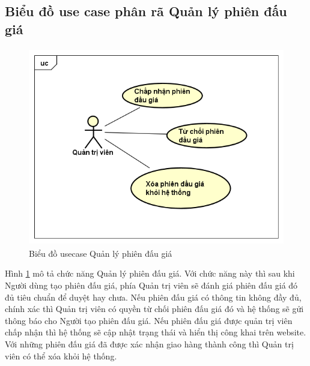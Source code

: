 \documentclass[../DoAn.tex]{subfiles}
\begin{document}
\subsection{Biểu đồ use case phân rã Quản lý phiên đấu giá}
\begin{figure}[H]
    \centering
    \includegraphics[width=0.75\linewidth,height=8.67cm]{Hinhve/uc quản lý phiên đấu giá.png}
    \caption{Biểu đồ usecase Quản lý phiên đấu giá}
    \label{fig:Fig23}
\end{figure}
Hình \ref{fig:Fig23} mô tả chức năng Quản lý phiên đấu giá. Với chức năng này thì sau khi Người dùng tạo phiên đấu giá, phía Quản trị viên sẽ đánh giá phiên đấu giá đó đủ tiêu chuẩn để duyệt hay chưa. Nếu phiên đấu giá có thông tin không đầy đủ, chính xác thì Quản trị viên có quyền từ chối phiên đấu giá đó và hệ thống sẽ gửi thông báo cho Người tạo phiên đấu giá. Nếu phiên đấu giá được quản trị viên chấp nhận thì hệ thống sẽ cập nhật trạng thái và hiển thị công khai trên website. Với những phiên đấu giá đã được xác nhận giao hàng thành công thì Quản trị viên có thể xóa khỏi hệ thống.
\end{document}
